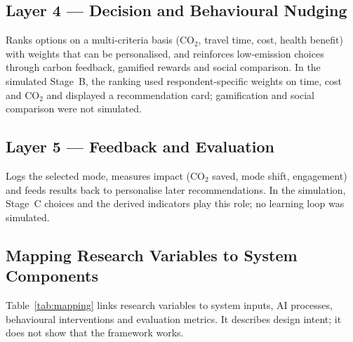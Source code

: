 \documentclass[11pt,a4paper]{article}
\begin{document}
\subsection{Layer 4 --- Decision and Behavioural Nudging}
Ranks options on a multi-criteria basis (CO$_2$, travel time, cost, health benefit) with weights that
can be personalised, and reinforces low-emission choices through carbon feedback, gamified rewards and
social comparison. In the simulated Stage~B, the ranking used respondent-specific weights on time,
cost and CO$_2$ and displayed a recommendation card; gamification and social comparison were not
simulated.

\subsection{Layer 5 --- Feedback and Evaluation}
Logs the selected mode, measures impact (CO$_2$ saved, mode shift, engagement) and feeds results back
to personalise later recommendations. In the simulation, Stage~C choices and the derived indicators
play this role; no learning loop was simulated.

\subsection{Mapping Research Variables to System Components}
Table~\ref{tab:mapping} links research variables to system inputs, AI processes, behavioural
interventions and evaluation metrics. It describes design intent; it does not show that the framework
works.
\end{document}
